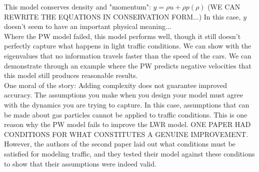 \documentclass{article}
\begin{document}
This model conserves density and "momentum": $y = \rho u + \rho p(\rho)$ (WE CAN REWRITE THE EQUATIONS IN CONSERVATION FORM...) In this case, $y$ doesn't seem to have an important physical meaning... \\

Where the PW model failed, this model performs well, though it still doesn't perfectly capture what happens in light traffic conditions.  We can show with the eigenvalues that no information travels faster than the speed of the cars.  We can demonstrate through an example where the PW predicts negative velocities that this model still produces reasonable results.  \\

One moral of the story: Adding complexity does not guarantee improved accuracy.  The assumptions you make when you design your model must agree with the dynamics you are trying to capture.  In this case, assumptions that can be made about gas particles cannot be applied to traffic conditions.  This is one reason why the PW model fails to improve the LWR model.  ONE PAPER HAD CONDITIONS FOR WHAT CONSTITUTES A GENUINE IMPROVEMENT.  However, the authors of the second paper laid out what conditions must be satisfied for modeling traffic, and they tested their model against these conditions to show that their assumptions were indeed valid.  
\end{document}
